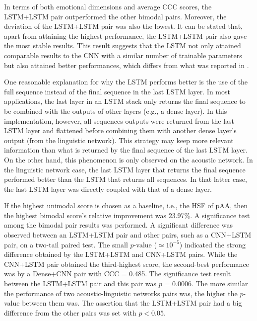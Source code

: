 In terms of both emotional dimensions and average CCC scores, the LSTM+LSTM
pair outperformed the other bimodal pairs. Moreover, the deviation of the
LSTM+LSTM pair was also the lowest. It can be stated that, apart from attaining
the highest performance, the LSTM+LSTM pair also gave the most stable results.
This result suggests that the LSTM not only attained comparable results to the
CNN with a similar number of trainable parameters but also attained better
performances, which differs from what was reported in \cite{Schmitt2019}.

One reasonable explanation for why the LSTM performs better is the use of the
full sequence instead of the final sequence in the last LSTM layer. In most
applications, the last layer in an LSTM stack only returns the final sequence
to be combined with the outputs of other layers (e.g., a dense layer). In this
implementation, however, all sequences outputs were returned from the last LSTM
layer and flattened before combining them with another dense layer's output
(from the linguistic network). This strategy may keep more relevant information
than what is returned by the final sequence of the last LSTM layer. On the
other hand, this phenomenon is only observed on the acoustic network. In the
linguistic network case, the last LSTM layer that returns the final sequence
performed better than the LSTM that returns all sequences. In that latter case,
the last LSTM layer was directly coupled with that of a dense layer.

If the highest unimodal score is chosen as a baseline, i.e., the HSF of pAA,
then the highest bimodal score's relative improvement was 23.97\%. A
significance test among the bimodal pair results was performed. A significant
difference was observed between an LSTM+LSTM pair and other pairs, such as a
CNN+LSTM pair, on a two-tail paired test. The small $p$-value ($\simeq
10^{-5}$) indicated the strong difference obtained by the LSTM+LSTM and
CNN+LSTM pairs.  While the CNN+LSTM pair obtained the third-highest score, the
second-best performance was by a Dense+CNN pair with CCC = 0.485. The
significance test result between the LSTM+LSTM pair and this pair was $p$ =
0.0006. The more similar the performance of two acoustic-linguistic networks
pairs was, the higher the $p$-value between them was. The assertion that the
LSTM+LSTM pair had a big difference from the other pairs was set with $p <
0.05$.

